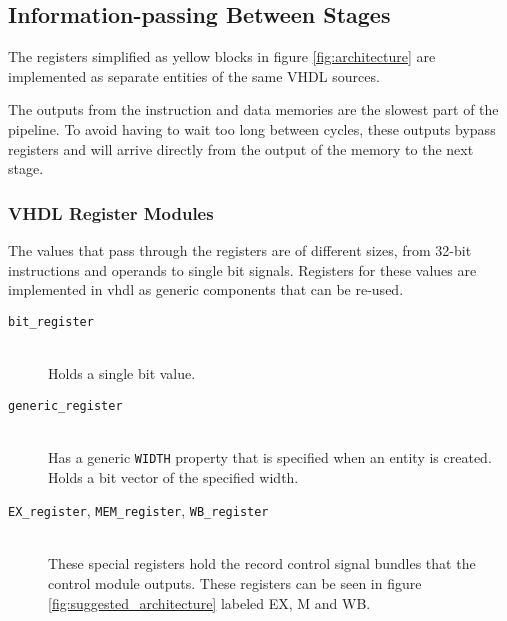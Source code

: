 \subsection{Information-passing Between Stages}
The registers simplified as yellow blocks in figure \ref{fig:architecture} are implemented as separate entities of the same VHDL sources.

The outputs from the instruction and data memories are the slowest part of the pipeline.
To avoid having to wait too long between cycles,
these outputs bypass registers and will arrive directly from the output of the memory to the next stage.

\subsubsection{VHDL Register Modules}
The values that pass through the registers are of different sizes,
from 32-bit instructions and operands to single bit signals.
Registers for these values are implemented in \gls{vhdl} as generic components that can be re-used.

\begin{description}
    \item[\texttt{bit\_register}]
        \hfill\\
        Holds a single bit value.
    \item[\texttt{generic\_register}]
        \hfill\\
        Has a generic \texttt{WIDTH} property that is specified when an entity is created.
        Holds a bit vector of the specified width.
    \item[\texttt{EX\_register}, \texttt{MEM\_register}, \texttt{WB\_register}]
        \hfill\\
        These special registers hold the record control signal bundles that the control module outputs.
        These registers can be seen in figure \ref{fig:suggested_architecture} labeled EX, M and WB.
\end{description}

